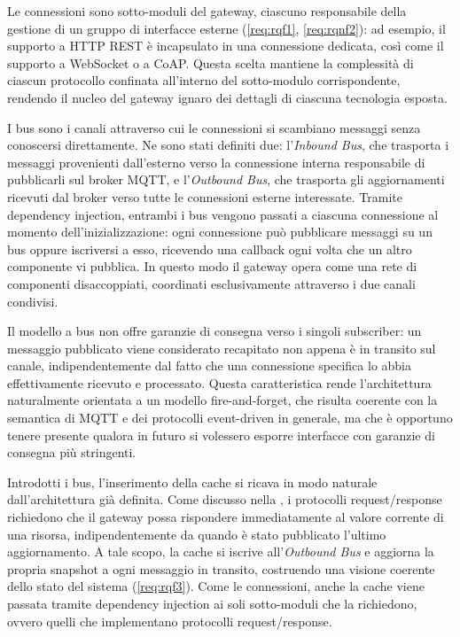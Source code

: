 Le connessioni sono sotto-moduli del gateway, ciascuno responsabile della gestione di un gruppo di interfacce esterne (\ref{req:rqf1}, \ref{req:rqnf2}): ad esempio, il supporto a \ac{HTTP} \ac{REST} è incapsulato in una connessione dedicata, così come il supporto a WebSocket o a \ac{CoAP}. Questa scelta mantiene la complessità di ciascun protocollo confinata all'interno del sotto-modulo corrispondente, rendendo il nucleo del gateway ignaro dei dettagli di ciascuna tecnologia esposta.

I bus sono i canali attraverso cui le connessioni si scambiano messaggi senza conoscersi direttamente. Ne sono stati definiti due: l'\textit{Inbound Bus}, che trasporta i messaggi provenienti dall'esterno verso la connessione interna responsabile di pubblicarli sul broker \ac{MQTT}, e l'\textit{Outbound Bus}, che trasporta gli aggiornamenti ricevuti dal broker verso tutte le connessioni esterne interessate. Tramite dependency injection, entrambi i bus vengono passati a ciascuna connessione al momento dell'inizializzazione: ogni connessione può pubblicare messaggi su un bus oppure iscriversi a esso, ricevendo una callback ogni volta che un altro componente vi pubblica. In questo modo il gateway opera come una rete di componenti disaccoppiati, coordinati esclusivamente attraverso i due canali condivisi.

Il modello a bus non offre garanzie di consegna verso i singoli subscriber: un messaggio pubblicato viene considerato recapitato non appena è in transito sul canale, indipendentemente dal fatto che una connessione specifica lo abbia effettivamente ricevuto e processato. Questa caratteristica rende l'architettura naturalmente orientata a un modello fire-and-forget, che risulta coerente con la semantica di \ac{MQTT} e dei protocolli event-driven in generale, ma che è opportuno tenere presente qualora in futuro si volessero esporre interfacce con garanzie di consegna più stringenti.

Introdotti i bus, l'inserimento della cache si ricava in modo naturale dall'architettura già definita. Come discusso nella , i protocolli request/response richiedono che il gateway possa rispondere immediatamente al valore corrente di una risorsa, indipendentemente da quando è stato pubblicato l'ultimo aggiornamento. A tale scopo, la cache si iscrive all'\textit{Outbound Bus} e aggiorna la propria snapshot a ogni messaggio in transito, costruendo una visione coerente dello stato del sistema (\ref{req:rqf3}). Come le connessioni, anche la cache viene passata tramite dependency injection ai soli sotto-moduli che la richiedono, ovvero quelli che implementano protocolli request/response.

